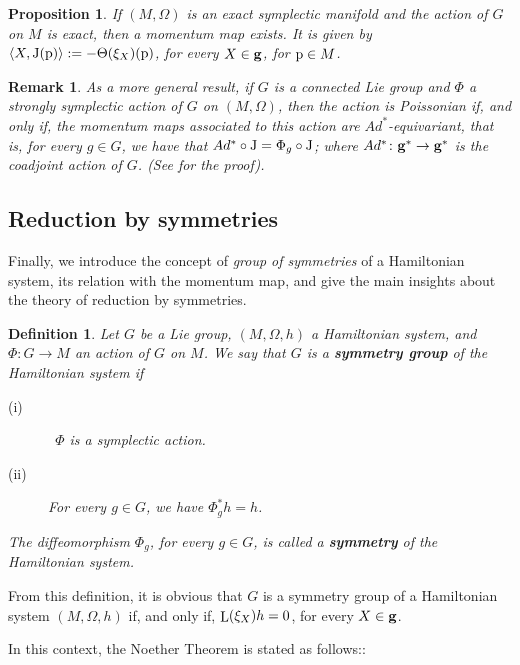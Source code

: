 \documentclass[12pt]{report}
\newtheorem{prop}[teor]{Proposition}
\newtheorem{definition}[teor]{Definition}
\newtheorem{remark}[teor]{Remark}
\def\Lie{\mathop{\rm L}\nolimits}
\begin{document}
\begin{prop}
If $(M,\Omega )$ is an exact symplectic manifold
and the action of $G$ on $M$ is exact,
then a momentum map exists. It is given by
$\langle X,{\rm J}({\rm p})\rangle:= -\Theta (\xi_X)({\rm p})$,
for every $X \in {\bf g}$, for ${\rm p}\in M$.
\end{prop}

\begin{remark}{\rm 
As a more general result,
if $G$ is a connected Lie group and $\Phi$ a strongly symplectic action
of $G$ on $(M,\Omega)$, then the action is Poissonian
if, and only if,
the momentum maps associated to this action 
are $Ad^*$-equivariant, that is,
for every $g \in G$, we have that $Ad^*\circ {\rm J}=\Phi_g\circ{\rm J}$;
where $Ad^*\colon{\bf g}^*\to{\bf g}^*$ is the {\sl coadjoint action} of $G$.
(See \cite{So-ssd} for the proof).
}\end{remark}


\subsection{Reduction by symmetries}
\label{cami3}


Finally, we introduce the concept of 
{\sl group of symmetries} of a Hamiltonian system,
its relation with the momentum map,
and give the main insights about the theory of reduction by symmetries.

\begin{definition}
Let $G$ be a Lie group, $(M,\Omega,h)$ a Hamiltonian system, 
and $\Phi \colon G \to M$ an action of $G$ on $M$.
We say that $G$ is a \textbf{symmetry group} of the Hamiltonian system if
\begin{description}
\item[{\rm (i)}] \ 
$\Phi$ is a symplectic action.
\item[{\rm (ii)}]
For every $g \in G$, we have $\Phi_g^*h = h$.
\end{description}
The diffeomorphism $\Phi_g$, for every $g \in G$, is called a
\textbf{symmetry} of the Hamiltonian system.
\end{definition}

From this definition, it is obvious that 
$G$ is a symmetry group of a Hamiltonian system $(M,\Omega,h)$
if, and only if,  $\Lie(\xi_X)h = 0$, for every $X \in {\bf g}$. 

In this context, the Noether Theorem is stated as follows::
\end{document}
